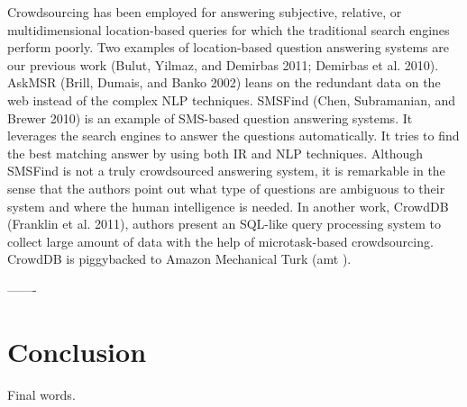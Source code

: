 \documentclass[11pt,letterpaper]{article}
\begin{document}
Crowdsourcing has been employed for answering subjective,
relative, or multidimensional location-based queries
for which the traditional search engines perform poorly.
Two examples of location-based question answering systems
are our previous work (Bulut, Yilmaz, and Demirbas 2011;
Demirbas et al. 2010). AskMSR (Brill, Dumais, and Banko
2002) leans on the redundant data on the web instead of the
complex NLP techniques. SMSFind (Chen, Subramanian,
and Brewer 2010) is an example of SMS-based question answering
systems. It leverages the search engines to answer
the questions automatically. It tries to find the best matching
answer by using both IR and NLP techniques. Although
SMSFind is not a truly crowdsourced answering system, it is
remarkable in the sense that the authors point out what type
of questions are ambiguous to their system and where the
human intelligence is needed. In another work, CrowdDB
(Franklin et al. 2011), authors present an SQL-like query processing
system to collect large amount of data with the help
of microtask-based crowdsourcing. CrowdDB is piggybacked
to Amazon Mechanical Turk (amt ).

-------



\section{Conclusion}
\label{sec:conclusion}

Final words.




\end{document}
